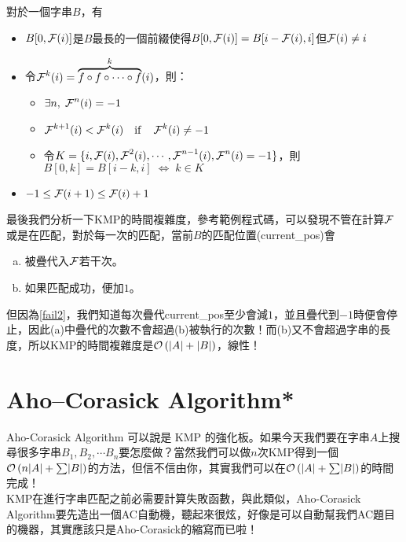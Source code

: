\documentclass[a4paper,12pt]{book}
\begin{document}

\begin{theorem}[定理]
  對於一個字串$B$，有
  \begin{itemize}
    \item $B[0, \operatorname{\mathcal{F}}(i)]$是$B$最長的一個前綴使得$B[0, \operatorname{\mathcal{F}}(i)] = B[i - \operatorname{\mathcal{F}}(i), i]$但$\operatorname{\mathcal{F}}(i) \neq i$
    \item 令$\operatorname{\mathcal{F}}^k(i) = \overbrace{f \circ f \circ \cdots \circ f}^{k} (i)$，則：
      \begin{itemize}
        \item $\exists n, \; \operatorname{\mathcal{F}}^n(i) = -1$
        \item $ \operatorname{\mathcal{F}}^{k+1}(i) < \operatorname{\mathcal{F}}^{k}(i) \quad \text{if} \quad \operatorname{\mathcal{F}}^k(i) \neq -1 $ \listeqn \label{fail2}
        \item 令$K = \{ i, \operatorname{\mathcal{F}}(i), \operatorname{\mathcal{F}}^2(i) , \cdots , \operatorname{\mathcal{F}}^{n-1}(i), \operatorname{\mathcal{F}}^n(i) = -1\}$，則\\$B[0, k] = B[i-k, i] \; \Leftrightarrow \; k \in K$ \listeqn
      \end{itemize}
    \item $-1 \leq \operatorname{\mathcal{F}}(i+1) \leq \operatorname{\mathcal{F}}(i) + 1$ \listeqn
  \end{itemize}
\end{theorem}

最後我們分析一下KMP的時間複雜度，參考範例程式碼，可以發現不管在計算$\operatorname{\mathcal{F}}$或是在匹配，對於每一次的匹配，當前$B$的匹配位置(current\_pos)會
\begin{enumerate}[(a)]
  \item 被疊代入$\operatorname{\mathcal{F}}$若干次。
  \item 如果匹配成功，便加$1$。
\end{enumerate}
但因為\eqref{fail2}，我們知道每次疊代current\_pos至少會減$1$，並且疊代到$-1$時便會停止，因此(a)中疊代的次數不會超過(b)被執行的次數！而(b)又不會超過字串的長度，所以KMP的時間複雜度是$\operatorname{\mathcal{O}}\left(\lvert A \rvert + \lvert B \rvert\right)$，線性！

\section{Aho–Corasick Algorithm*}
  Aho-Corasick Algorithm 可以說是 KMP 的強化板。如果今天我們要在字串$A$上搜尋很多字串$B_1, B_2, \cdots B_n$要怎麼做？當然我們可以做$n$次KMP得到一個$\operatorname{\mathcal{O}}\left(n\lvert A \rvert + \sum\lvert B \rvert\right)$的方法，但信不信由你，其實我們可以在$\operatorname{\mathcal{O}}\left(\lvert A \rvert + \sum \lvert B \rvert\right)$的時間完成！ \\
%
  KMP在進行字串匹配之前必需要計算失敗函數，與此類似，Aho-Corasick Algorithm要先造出一個AC自動機，聽起來很炫，好像是可以自動幫我們AC題目的機器，其實應該只是Aho-Corasick的縮寫而已啦！ \\
\end{document}
